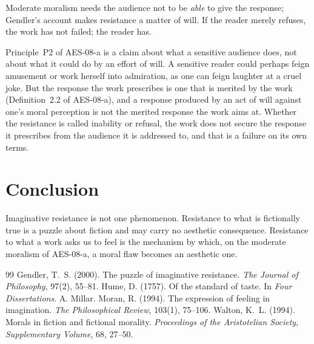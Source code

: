 \documentclass{situationist-preprint}
\begin{document}
\begin{objection}
Moderate moralism needs the audience not to be \emph{able} to give the response; Gendler's account makes resistance a matter of will. If the reader merely refuses, the work has not failed; the reader has.
\end{objection}

\begin{reply}
Principle~P2 of AES-08-a is a claim about what a sensitive audience does, not about what it could do by an effort of will. A sensitive reader could perhaps feign amusement or work herself into admiration, as one can feign laughter at a cruel joke. But the response the work prescribes is one that is merited by the work (Definition~2.2 of AES-08-a), and a response produced by an act of will against one's moral perception is not the merited response the work aims at. Whether the resistance is called inability or refusal, the work does not secure the response it prescribes from the audience it is addressed to, and that is a failure on its own terms.
\end{reply}

\section{Conclusion}

Imaginative resistance is not one phenomenon. Resistance to what is fictionally true is a puzzle about fiction and may carry no aesthetic consequence. Resistance to what a work asks us to feel is the mechanism by which, on the moderate moralism of AES-08-a, a moral flaw becomes an aesthetic one.

\begin{thebibliography}{99}\small
{} Gendler, T.~S. (2000). The puzzle of imaginative resistance. \emph{The Journal of Philosophy}, 97(2), 55--81.
 Hume, D. (1757). Of the standard of taste. In \emph{Four Dissertations}. A. Millar.
 Moran, R. (1994). The expression of feeling in imagination. \emph{The Philosophical Review}, 103(1), 75--106.
 Walton, K.~L. (1994). Morals in fiction and fictional morality. \emph{Proceedings of the Aristotelian Society, Supplementary Volume}, 68, 27--50.
\end{thebibliography}
\end{document}
